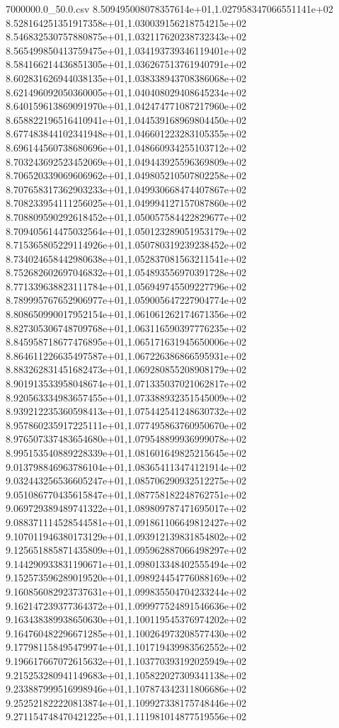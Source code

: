 \begin{filecontents*}{7000000.0_50.0.csv}
8.509495008078357614e+01,1.027958347066551141e+02
8.528164251351917358e+01,1.030039156218754215e+02
8.546832530757880875e+01,1.032117620238732343e+02
8.565499850413759475e+01,1.034193739346119401e+02
8.584166214436851305e+01,1.036267513761940791e+02
8.602831626944038135e+01,1.038338943708386068e+02
8.621496092050360005e+01,1.040408029408645234e+02
8.640159613869091970e+01,1.042474771087217960e+02
8.658822196516410941e+01,1.044539168969804450e+02
8.677483844102341948e+01,1.046601223283105355e+02
8.696144560738680696e+01,1.048660934255103712e+02
8.703243692523452069e+01,1.049443925596369809e+02
8.706520339069606962e+01,1.049805210507802258e+02
8.707658317362903233e+01,1.049930668474407867e+02
8.708233954111256025e+01,1.049994127157087860e+02
8.708809590292618452e+01,1.050057584422829677e+02
8.709405614475032564e+01,1.050123289051953179e+02
8.715365805229114926e+01,1.050780319239238452e+02
8.734024658442980638e+01,1.052837081563211541e+02
8.752682602697046832e+01,1.054893556970391728e+02
8.771339638823111784e+01,1.056949745509227796e+02
8.789995767652906977e+01,1.059005647227904774e+02
8.808650990017952154e+01,1.061061262174671356e+02
8.827305306748709768e+01,1.063116590397776235e+02
8.845958718677476895e+01,1.065171631945650006e+02
8.864611226635497587e+01,1.067226386866595931e+02
8.883262831451682473e+01,1.069280855208908179e+02
8.901913533958048674e+01,1.071335037021062817e+02
8.920563334983657455e+01,1.073388932351545009e+02
8.939212235360598413e+01,1.075442541248630732e+02
8.957860235917225111e+01,1.077495863760950670e+02
8.976507337483654680e+01,1.079548899936999078e+02
8.995153540889228339e+01,1.081601649825215645e+02
9.013798846963786104e+01,1.083654113474121914e+02
9.032443256536605247e+01,1.085706290932512275e+02
9.051086770435615847e+01,1.087758182248762751e+02
9.069729389489741322e+01,1.089809787471695017e+02
9.088371114528544581e+01,1.091861106649812427e+02
9.107011946380173129e+01,1.093912139831854802e+02
9.125651885871435809e+01,1.095962887066498297e+02
9.144290933831190671e+01,1.098013348402555494e+02
9.152573596289019520e+01,1.098924454776088169e+02
9.160856082923737631e+01,1.099835504704233244e+02
9.162147239377364372e+01,1.099977524891546636e+02
9.163438389938650630e+01,1.100119545376974202e+02
9.164760482296671285e+01,1.100264973208577430e+02
9.177981158495479974e+01,1.101719439983562552e+02
9.196617667072615632e+01,1.103770393192025949e+02
9.215253280941149683e+01,1.105822027309341138e+02
9.233887999516998946e+01,1.107874342311806686e+02
9.252521822220813874e+01,1.109927338175748446e+02
9.271154748470421225e+01,1.111981014877519556e+02

\end{filecontents*}
